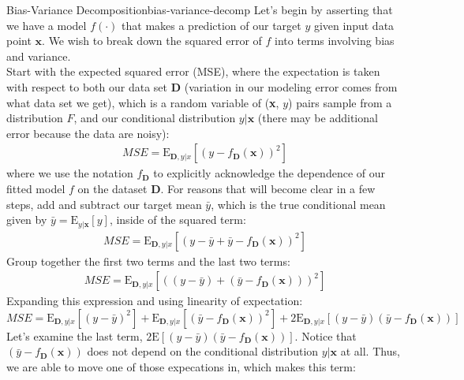 \begin{derivation}{Bias-Variance Decomposition}{bias-variance-decomp}
    Let's begin by asserting that we have a model $f(\cdot)$ that makes a prediction of our target $y$ given input data point $\textbf{x}$. We wish to break down the squared error of $f$ into terms involving bias and variance. \\

    Start with the expected squared error (MSE), where the expectation is taken with respect to both our data set $\textbf{D}$ (variation in our modeling error comes from what data set we get), which is a random variable of (\textbf{x}, $y$) pairs sample from a distribution $F$, and our conditional distribution $y | \textbf{x}$ (there may be additional error because the data are noisy):
    \begin{align*}
        \textit{MSE} = \mathrm{E}_{\textbf{D},y|x}[(y - f_\textbf{D}(\textbf{x}))^{2}]
    \end{align*}
    where we use the notation $f_\textbf{D}$ to explicitly acknowledge the dependence of our fitted model $f$ on the dataset $\textbf{D}$.  For reasons that will become clear in a few steps, add and subtract our target mean $\bar{y}$, which is the true conditional mean given by $\bar{y} = \mathrm{E}_{y|\textbf{x}}[y]$, inside of the squared term:
    \begin{align*}
        \textit{MSE} = \mathrm{E}_{\textbf{D},y|x}[(y - \bar{y} + \bar{y} - f_\textbf{D}(\textbf{x}))^{2}]
    \end{align*}
    Group together the first two terms and the last two terms:
    \begin{align*}
        \textit{MSE} = \mathrm{E}_{\textbf{D},y|x}[((y - \bar{y}) + (\bar{y} - f_\textbf{D}(\textbf{x})))^{2}]
    \end{align*}
    Expanding this expression and using linearity of expectation:
    \begin{equation} \label{bias-variance-intermediate-1}
        \textit{MSE} = \mathrm{E}_{\textbf{D},y|x}[(y - \bar{y})^{2}] + \mathrm{E}_{\textbf{D},y|x}[(\bar{y} - f_\textbf{D}(\textbf{x}))^{2}] + 2\mathrm{E}_{\textbf{D},y|x}[(y - \bar{y})(\bar{y} - f_\textbf{D}(\textbf{x}))]
    \end{equation}
    Let's examine the last term, $2\mathrm{E}[(y - \bar{y})(\bar{y} - f_\textbf{D}(\textbf{x}))]$. Notice that $(\bar{y} - f_\textbf{D}(\textbf{x}))$ does not depend on the conditional distribution $y|\textbf{x}$ at all. Thus, we are able to move one of those expecations in, which makes this term:

\end{derivation}
